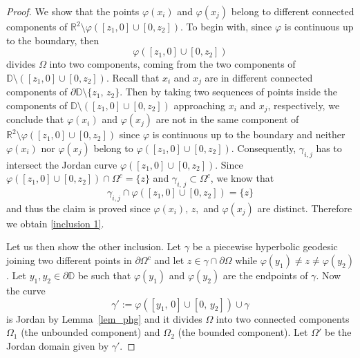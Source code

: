 \documentclass[reqno,11pt]{amsart}
\def\rr{{\mathbb R}}
\numberwithin{equation}{section}
\theoremstyle{remark}
\begin{document}
\begin{proof}
We show that the points $\varphi(x_i)$ and $\varphi(x_j)$
belong to different connected components of 
$\rr^2 \setminus \varphi([z_1,0]\cup[0,z_2])$. To begin with, since $\varphi$ is continuous up to the boundary, then $$\varphi([z_1,0]\cup[0,z_2])$$
divides $\Omega$ into two components, coming from the two components of $\mathbb D\setminus ([z_1,0]\cup[0,z_2])$. 
Recall that $x_i$ and $x_j$ are in different connected components of $\partial \mathbb D\setminus\{z_1,\,z_2\}$. 
Then by taking two sequences of points inside the components of $\mathbb D\setminus ([z_1,0]\cup[0,z_2])$ approaching $x_i$ and $x_j $, respectively, we conclude that $\varphi(x_i) $ and $\varphi(x_j) $ are not in the same component of $\rr^2 \setminus \varphi([z_1,0]\cup[0,z_2])$ since $\varphi$ is continuous up to the boundary and neither $\varphi(x_i)$ nor $\varphi(x_j)$ belong to $\varphi([z_1,0]\cup[0,z_2])$. 
Consequently,
$\gamma_{i,j}$ has to intersect the Jordan curve $\varphi([z_1,0]\cup[0,z_2])$. 
Since $\varphi([z_1,0]\cup[0,z_2]) \cap \Omega^c = \{z\}$ and 
$\gamma_{i,\,j}\subset \Omega^c$, we know that 
$$\gamma_{i,j}\cap \varphi([z_1,0]\cup[0,z_2]) =\{z\}$$
and thus the claim is 
proved since $\varphi(x_i),\, z,$  and $\varphi(x_j)$ are distinct. Therefore we obtain 
\eqref{inclusion 1}. 
 

 Let us then show the other inclusion. Let $\gamma$ be a piecewise hyperbolic 
geodesic joining two different points in $\partial \Omega^c$
 and let $z \in \gamma \cap \partial\Omega$ while $\varphi(y_1) \ne z \ne \varphi(y_2)$. 
Let $y_1,y_2 \in \partial \mathbb D$ be such that 
$\varphi(y_1)$ and $\varphi(y_2)$ are the endpoints of $\gamma$.
 Now the curve 
 $$\gamma' := \varphi([y_1,\,0]\cup[0,\,y_2]) \cup \gamma$$ is 
Jordan by Lemma~\ref{lem_phg} and it divides $\Omega$ into two
 connected components $\Omega_1$ (the unbounded component) and $\Omega_2$ 
(the bounded component). 
Let $\Omega'$ be the Jordan domain given by $\gamma'$. 



\end{proof}
\end{document}
